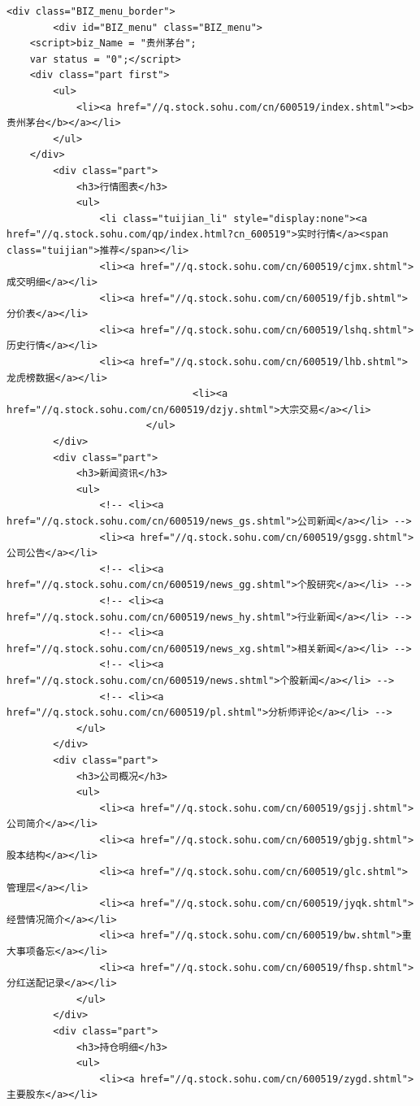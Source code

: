 \documentclass[UTF8,12pt]{article}
\begin{document}
\begin{lstlisting}[title=股票代码300117的界面html源码,frame=shadowbox]
    <div class="BIZ_menu_border">
        <div id="BIZ_menu" class="BIZ_menu">
    <script>biz_Name = "贵州茅台";
    var status = "0";</script>
    <div class="part first">
        <ul>
            <li><a href="//q.stock.sohu.com/cn/600519/index.shtml"><b>贵州茅台</b></a></li>
        </ul>
    </div>
        <div class="part">
            <h3>行情图表</h3>
            <ul>
                <li class="tuijian_li" style="display:none"><a href="//q.stock.sohu.com/qp/index.html?cn_600519">实时行情</a><span class="tuijian">推荐</span></li>
                <li><a href="//q.stock.sohu.com/cn/600519/cjmx.shtml">成交明细</a></li>
                <li><a href="//q.stock.sohu.com/cn/600519/fjb.shtml">分价表</a></li>
                <li><a href="//q.stock.sohu.com/cn/600519/lshq.shtml">历史行情</a></li>
                <li><a href="//q.stock.sohu.com/cn/600519/lhb.shtml">龙虎榜数据</a></li>
                                <li><a href="//q.stock.sohu.com/cn/600519/dzjy.shtml">大宗交易</a></li>
                        </ul>
        </div>
        <div class="part">
            <h3>新闻资讯</h3>
            <ul>
                <!-- <li><a href="//q.stock.sohu.com/cn/600519/news_gs.shtml">公司新闻</a></li> -->
                <li><a href="//q.stock.sohu.com/cn/600519/gsgg.shtml">公司公告</a></li>
                <!-- <li><a href="//q.stock.sohu.com/cn/600519/news_gg.shtml">个股研究</a></li> -->
                <!-- <li><a href="//q.stock.sohu.com/cn/600519/news_hy.shtml">行业新闻</a></li> -->
                <!-- <li><a href="//q.stock.sohu.com/cn/600519/news_xg.shtml">相关新闻</a></li> -->
                <!-- <li><a href="//q.stock.sohu.com/cn/600519/news.shtml">个股新闻</a></li> -->
                <!-- <li><a href="//q.stock.sohu.com/cn/600519/pl.shtml">分析师评论</a></li> -->
            </ul>
        </div>
        <div class="part">
            <h3>公司概况</h3>
            <ul>
                <li><a href="//q.stock.sohu.com/cn/600519/gsjj.shtml">公司简介</a></li>
                <li><a href="//q.stock.sohu.com/cn/600519/gbjg.shtml">股本结构</a></li>
                <li><a href="//q.stock.sohu.com/cn/600519/glc.shtml">管理层</a></li>
                <li><a href="//q.stock.sohu.com/cn/600519/jyqk.shtml">经营情况简介</a></li>
                <li><a href="//q.stock.sohu.com/cn/600519/bw.shtml">重大事项备忘</a></li>
                <li><a href="//q.stock.sohu.com/cn/600519/fhsp.shtml">分红送配记录</a></li>
            </ul>
        </div>
        <div class="part">
            <h3>持仓明细</h3>
            <ul>
                <li><a href="//q.stock.sohu.com/cn/600519/zygd.shtml">主要股东</a></li>

\end{lstlisting}
\end{document}
